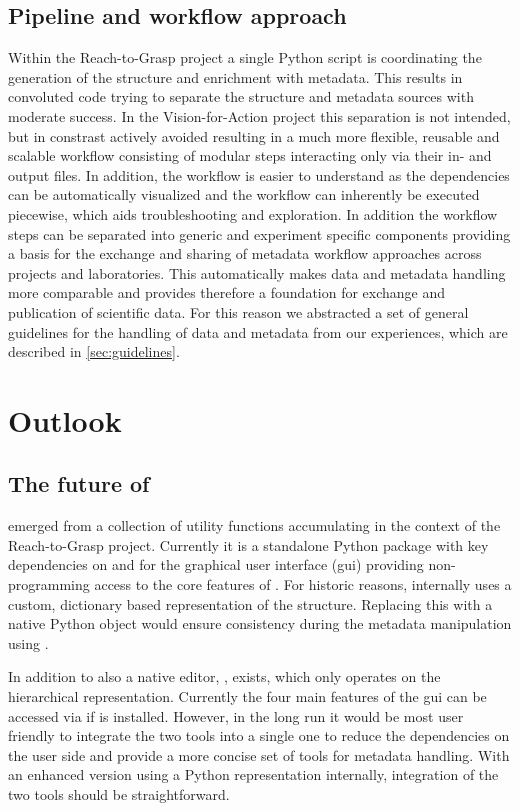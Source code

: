 \subsection{Pipeline and workflow approach}
Within the Reach-to-Grasp project a single Python script is coordinating the generation of the  structure and enrichment with metadata. This results in convoluted code trying to separate the  structure and metadata sources with moderate success. In the Vision-for-Action project this separation is not intended, but in constrast actively avoided resulting in a much more flexible, reusable and scalable workflow consisting of modular steps interacting only via their in- and output files. In addition, the workflow is easier to understand as the dependencies can be automatically visualized and the workflow can inherently be executed piecewise, which aids troubleshooting and exploration. In addition the workflow steps can be separated into generic and experiment specific components providing a basis for the exchange and sharing of metadata workflow approaches across projects and laboratories. This automatically makes data and metadata handling more comparable and provides therefore a foundation for exchange and publication of scientific data. For this reason we abstracted a set of general guidelines for the handling of data and metadata from our experiences, which are described in \cref{sec:guidelines}.


\section{Outlook}
\subsection{The future of }
 emerged from a collection of  utility functions accumulating in the context of the Reach-to-Grasp project. Currently it is a standalone Python package with key dependencies on  and  for the graphical user interface (gui) providing non-programming access to the core features of . For historic reasons,  internally uses a custom, dictionary based representation of the  structure. Replacing this with a native  Python object would ensure consistency during the metadata manipulation using .

In addition to  also a native  editor, , exists, which only operates on the hierarchical  representation. Currently the four main features of the  gui can be accessed via  if  is installed. However, in the long run it would be most user friendly to integrate the two tools into a single one to reduce the dependencies on the user side and provide a more concise set of tools for metadata handling. With an enhanced  version using a Python  representation internally, integration of the two tools should be straightforward.

